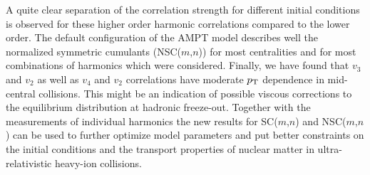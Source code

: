A quite clear separation of the correlation strength for different initial conditions is observed for these higher order harmonic correlations compared to the lower order.
The default configuration of the AMPT model describes well the normalized symmetric cumulants (NSC($m$,$n$)) for most centralities and for most combinations of harmonics which were considered. 
Finally, we have found that $v_3$ and $v_2$ as well as $v_4$ and $v_2$ correlations have moderate $p_{\rm T}$ dependence in mid-central collisions. This might be an indication of possible viscous corrections to the equilibrium distribution at hadronic freeze-out.
Together with the measurements of individual harmonics the new results for SC($m$,$n$) and NSC($m$,$n$) can be used to further optimize model parameters and put better constraints on the initial conditions and the transport properties of nuclear matter in ultra-relativistic heavy-ion collisions.





